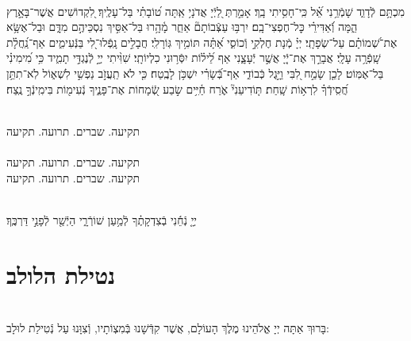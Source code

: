 \documentclass[twoside, openany, parskip=half, 11pt]{book}
\begin{document}
\begin{sometimes}

\\
%
מִכְתָּ֥ם לְֿדָוִ֑ד שָׁמְֿרֵ֥נִי אֵ֝֗ל כִּֽי־חָסִ֥יתִי בָֽךְ׃ אָמַ֣רְתְּ לַ֭יְֿיָ אֲדֹנָי֥ אַֽתָּה ט֝וֹבָתִ֗י בַּל־עָלֶֽיךָ׃ לִ֭קְדוֹשִׁים אֲשֶׁר־בָּאָ֣רֶץ הֵ֑מָּה וְֿ֝אַדִּירֵ֗י כׇּל־חֶפְצִי־בָֽם׃ יִרְבּ֥וּ עַצְּֿבוֹתָם֘ אַחֵ֢ר מָ֫הָ֥רוּ בַּל־אַסִּ֣יךְ נִסְכֵּיהֶ֣ם מִדָּ֑ם וּבַל־אֶשָּׂ֥א אֶת־שְׁ֝מוֹתָ֗ם עַל־שְׂפָתָֽי׃ יְיָ֗ מְֿנָת חֶלְקִ֣י וְֿכוֹסִ֑י אַ֝תָּ֗ה תּוֹמִ֥יךְ גּֽוֹרָלִֽי׃ חֲבָלִ֣ים נָֽפְֿלוּ־לִ֭י בַּנְּֿעִימִ֑ים אַף־נַֽ֝חֲלָ֗ת שָֽׁפְֿרָ֥ה עָלָֽי׃ אֲבָרֵ֣ךְ אֶת־יְֿ֖יָ אֲשֶׁ֣ר יְֿעָצָ֑נִי אַף לֵ֝יל֗וֹת יִסְּֿר֥וּנִי כִלְיוֹתָֽי׃ שִׁוִּ֨יתִי יְיָ֣ לְֿנֶגְדִּ֣י תָמִ֑יד כִּ֥י מִ֝ימִינִ֗י בַּל־אֶמּֽוֹט׃ לָכֵ֤ן שָׂמַ֣ח לִ֭בִּי וַיָּ֣גֶל כְּֿבוֹדִ֑י אַף־בְּֿ֝שָׂרִ֗י יִשְׁכֹּ֥ן לָבֶֽטַח׃ כִּ֤י לֹא תַֽעֲזֹ֣ב נַפְשִׁ֣י לִשְׁא֑וֹל לֹֽא־תִתֵּ֥ן חֲ֝סִֽידְֿךָ֗ לִרְא֥וֹת שָֽׁחַת׃ תּ֤וֹדִיעֵנִי֘ אֹ֢רַח חַ֫יִּ֥ים שׂ֣בַע שְֿׂ֭מָחוֹת אֶת־פָּנֶ֑יךָ נְֿעִימ֖וֹת בִּימִֽינְֿךָ֣ נֶֽצַח׃

\end{sometimes}



\begin{sometimes}

\\
תקיעה. שברים. תרועה. תקיעה\\
\\
תקיעה. שברים. תרועה. תקיעה\\
תקיעה. שברים. תרועה. תקיעה

\end{sometimes}

\vspace{-.5\baselineskip}

\\
 יְיָ֤ נְֿחֵ֬נִי בְֿצִדְקָתֶ֗ךָ לְֿמַ֥עַן שׁוֹרְֿרָ֑י הַיְֿשַׁ֖ר לְֿפָנַ֣י דַּרְכֶּֽךָ׃

\vfill

\quad{}\quad{}






\section[נטילת הלולב]{ נטילת הלולב }
\label{lulav}
\\
בָּרוּךְ אַתָּה יְיָ אֱלֹהֵינוּ מֶלֶךְ הָעוֹלָם, אֲשֶׁר קִדְּֿשָׁנוּ בְּֿמִצְוֹתָיו, וְֿצִוָּנוּ עַל נְֿטִילַת לוּלָב:
\end{document}
